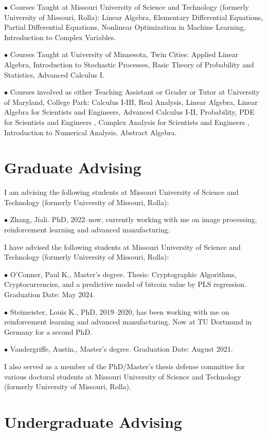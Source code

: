 \documentclass[margin,line]{res}
\begin{document}
\begin{resume}
$\bullet$ Courses Taught at Missouri University of Science and Technology (formerly University of Missouri, Rolla):
Linear Algebra, Elementary Differential Equations, Partial Differential Equations, Nonlinear Optimization in Machine Learning, Introduction to Complex Variables. 


$\bullet$ Courses Taught at University of Minnesota, Twin Cities: Applied Linear Algebra, Introduction to Stochastic
Processes, Basic Theory of Probability and
Statistics, Advanced Calculus I.


$\bullet$ Courses involved as either Teaching Assistant or Grader or Tutor at University of Maryland, College Park: 
Calculus I-III, Real Analysis, Linear Algebra, Linear
Algebra for Scientists and Engineers, Advanced Calculus I-II,
Probability, PDE for Scientists and Engineers , Complex Analysis for Scientists and Engineers , Introduction to Numerical Analysis, Abstract Algebra.


\section{\sc Graduate Advising}

I am advising the following students at Missouri University of Science and Technology (formerly University of Missouri, Rolla):

$\bullet$ Zhang, Jiali. PhD, 2022--now, currently working with me on image processing, reinforcement learning and advanced manufacturing.

I have advised the following students at Missouri University of Science and Technology (formerly University of Missouri, Rolla):

$\bullet$ O'Conner, Paul K., Master's degree. Thesis: Cryptographic Algorithms, Cryptocurrencies, and a predictive model of bitcoin value by PLS regression. Graduation Date: May 2024.

$\bullet$ Steimeister, Louis K., PhD, 2019--2020, has been working with me on reinforcement learning and advanced manufacturing. Now at TU Dortmund in Germany for a second PhD.

$\bullet$ Vandergriffe, Austin., Master's degree. Graduation Date: August 2021.

I also served as a member of the PhD/Master's thesis defense committee for various doctoral students at Missouri University of Science and Technology (formerly University of Missouri, Rolla).


\section{\sc Undergraduate Advising}


\end{resume}
\end{document}
